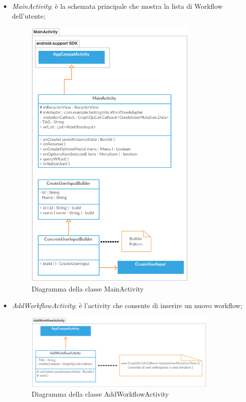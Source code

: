 \begin{itemize}
   \item \emph{MainActivity}: è la schemata principale che mostra la lista di Workflow dell'utente;
        \begin{figure}[H]
	    \begin{center}
		\includegraphics[width=0.8\textwidth, keepaspectratio]{../includes/pics/mainactivity.png}
		\caption{Diagramma della classe MainActivity}
	    \end{center}
        \end{figure}
        

    \item \emph{AddWorkflowActivity}: è l'activity che consente di inserire un nuovo workflow;
       \begin{figure}[H]
	   \begin{center}
    
		\includegraphics[width=0.9\textwidth, keepaspectratio]{../includes/pics/addworkflowactivity.png}
		\caption{Diagramma della classe AddWorkflowActivity}
	   \end{center}
       \end{figure}
   

\end{itemize}
